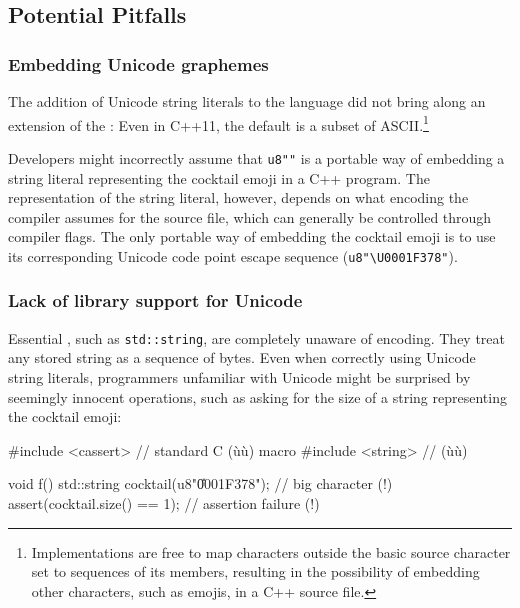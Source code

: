 \subsection[Potential Pitfalls]{Potential Pitfalls}\label{potential-pitfalls}

\subsubsection[Embedding Unicode graphemes]{Embedding Unicode graphemes}\label{embedding-unicode-graphemes}

The addition of Unicode string literals to the language did not bring
along an extension of the : Even in C++11, the
default  is a subset of
ASCII.{\cprotect\footnote{Implementations are free to map characters
outside the basic source character set to sequences of its members,
resulting in the possibility of embedding other characters, such as emojis, in a C++ source file.}}

Developers might incorrectly assume that \lstinline!u8"!\martini\lstinline!"! is a
portable way of embedding a string literal representing the cocktail
emoji in a C++ program. The representation of the string literal, however, depends on what
encoding the compiler assumes for the source file, which can generally
be controlled through compiler flags. The only portable way of embedding
the cocktail emoji is to use its corresponding Unicode code point escape
sequence (\lstinline!u8"\U0001F378"!).

\subsubsection[Lack of library support for Unicode]{Lack of library support for Unicode}\label{lack-of-library-support-for-unicode}

Essential , such as \lstinline!std::string!, are
completely unaware of encoding. They treat any stored string as a
sequence of bytes. Even when correctly using Unicode string literals,
programmers unfamiliar with Unicode might be surprised by seemingly
innocent operations, such as asking for the size of a string
representing the cocktail emoji:

\begin{emcppslisting}
#include <cassert>  // standard C (ù{}ù) macro
#include <string>   // (ù{}ù)
                                                                                
void f()                                                                        
{                                                                               
    std::string cocktail(u8"\U0001F378"); // big character (!)                  
    assert(cocktail.size() == 1);         // assertion failure (!)              
}
\end{emcppslisting}
    
